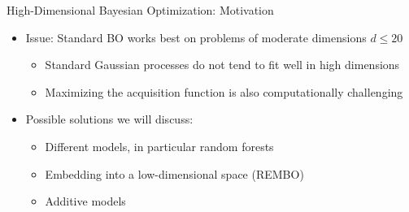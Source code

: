 \subtitle{High-Dimensional Bayesian Optimization}

\maketitle
\begin{frame}[c]{High-Dimensional Bayesian Optimization: Motivation}

\begin{itemize}
    \item Issue: Standard BO works best on problems of moderate dimensions $d\leq20$
    \begin{itemize}
        \item Standard Gaussian processes do not tend to fit well in high dimensions
        \item Maximizing the acquisition function is also computationally challenging
    \end{itemize}
\medskip
\pause

    \item Possible solutions we will discuss:
    \begin{itemize}
        \item Different models, in particular random forests 
        \item Embedding into a low-dimensional space (REMBO) 
        \item Additive models 
    \end{itemize}
\end{itemize}


\end{frame}



